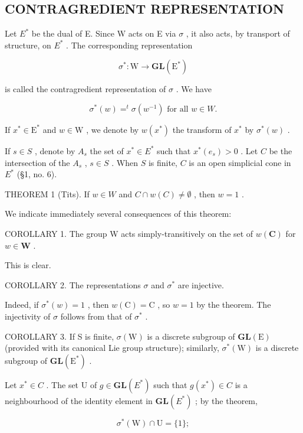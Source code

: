 \subsection{CONTRAGREDIENT REPRESENTATION}

Let \(E^{*}\) be the dual of E. Since W acts on E via \(\sigma\) , it also acts, by transport of structure, on \(E^{*}\) . The corresponding representation

\[
\sigma^ {*}: \mathrm{W} \to \mathbf {G L} (\mathrm{E} ^ {*})
\]

is called the contragredient representation of \(\sigma\) . We have

\[
\sigma^ {*} (w) = ^ {t} \sigma \left(w ^ {- 1}\right) \text {   for   all   } w \in W.
\]

If \(x^{*} \in \mathrm{E}^{*}\) and \(w \in \mathrm{W}\) , we denote by \(w(x^{*})\) the transform of \(x^{*}\) by \(\sigma^{*}(w)\) .

If \(s \in S\) , denote by \(A_s\) the set of \(x^* \in E^*\) such that \(x^*(e_s) > 0\) . Let \(C\) be the intersection of the \(A_s\) , \(s \in S\) . When \(S\) is finite, \(C\) is an open simplicial cone in \(E^*\) (§1, no. 6).

THEOREM 1 (Tits). If \(w \in W\) and \(C \cap w(C) \neq \emptyset\) , then \(w = 1\) .

We indicate immediately several consequences of this theorem:

COROLLARY 1. The group W acts simply-transitively on the set of \(w(\mathbf{C})\) for \(w \in \mathbf{W}\) .

This is clear.

COROLLARY 2. The representations \(\sigma\) and \(\sigma^{*}\) are injective.

Indeed, if \(\sigma^{*}(w) = 1\) , then \(w(\mathrm{C}) = \mathrm{C}\) , so \(w = 1\) by the theorem. The injectivity of \(\sigma\) follows from that of \(\sigma^{*}\) .

COROLLARY 3. If S is finite, \(\sigma(\mathrm{W})\) is a discrete subgroup of \(\mathbf{GL}(\mathrm{E})\) (provided with its canonical Lie group structure); similarly, \(\sigma^{*}(\mathrm{W})\) is a discrete subgroup of \(\mathbf{GL}(\mathrm{E}^{*})\) .

Let \(x^{*} \in C\) . The set U of \(g \in \mathbf{GL}(E^{*})\) such that \(g(x^{*}) \in C\) is a neighbourhood of the identity element in \(\mathbf{GL}(E^{*})\) ; by the theorem,

\[
\sigma^ {*} (\mathrm{W}) \cap \mathrm{U} = \{1 \};
\]

